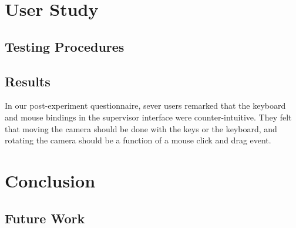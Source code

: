 \chapter{User Study}

\section{Testing Procedures}

\section{Results}
In our post-experiment questionnaire, sever users remarked that the keyboard and mouse bindings in the supervisor interface were counter-intuitive. They felt that moving the camera should be done with the keys or the keyboard, and rotating the camera should be a function of a mouse click and drag event.
\chapter{Conclusion}

\section{Future Work}
\label{section:futurework}